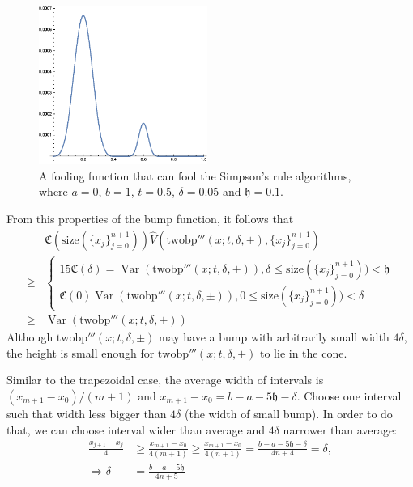 \documentclass{iitthesis}
\DeclareMathOperator{\Var}{Var}
\theoremstyle{definition}
\theoremstyle{remark}
\begin{document}
\begin{figure}[ht]
\centering
\includegraphics[width=5.5cm]{twobp.eps}
\caption{A fooling function that can fool the Simpson's rule algorithms, where $a=0$, $b=1$, $t=0.5$, $\delta=0.05$ and $\mathfrak{h}=0.1$. \label{fig:twobpfunction}}
\end{figure}

From this properties of the bump function, it follows that
\begin{align*}
  &\mathfrak{C}(\text{size}(\{x_j\}_{j=0}^{n+1}))\widehat{V}(\text{twobp}'''(x;t,\delta,\pm),\{x_j\}_{j=0}^{n+1})\\
  \ge & \begin{cases} \displaystyle 15\mathfrak{C}(\delta)=\Var(\text{twobp}'''(x;t,\delta,\pm)), \delta \le \text{size}(\{x_j\}_{j=0}^{n+1})) <\mathfrak{h}\\[1ex]
                      \displaystyle \mathfrak{C}(0)\Var(\text{twobp}'''(x;t,\delta,\pm)), 0\le \text{size}(\{x_j\}_{j=0}^{n+1}))<\delta
        \end{cases}\\
  \ge & \Var(\text{twobp}'''(x;t,\delta,\pm))
\end{align*}
Although $\text{twobp}'''(x;t,\delta,\pm)$ may have a bump with arbitrarily small width $4\delta$, the height is small enough for $\text{twobp}'''(x;t,\delta,\pm)$ to lie in the cone.

Similar to the trapezoidal case, the average width of intervals is $(x_{m+1}-x_{0})/(m+1)$ and $x_{m+1}-x_{0}=b-a-5\mathfrak{h}-\delta$. Choose one interval such that width less bigger than $4\delta$ (the width of small bump). In order to do that, we can choose interval wider than average and $4\delta$ narrower than average:
  \begin{align*}
    \frac{x_{j+1}-x_{j}}{4}&\ge\frac{x_{m+1}-x_{0}}{4(m+1)}\ge\frac{x_{m+1}-x_{0}}{4(n+1)}=\frac{b-a-5\mathfrak{h}-\delta}{4n+4}=\delta,\\
    \Rightarrow \delta&=\frac{b-a-5\mathfrak{h}}{4n+5}
  \end{align*}
\end{document}

